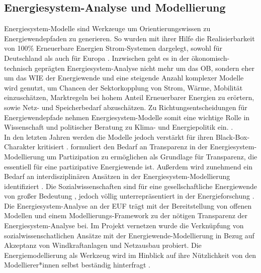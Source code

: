 \documentclass[a4paper,11pt,twoside]{scrartcl}
\begin{document}
\subsection*{Energiesystem-Analyse und Modellierung}
Energiesystem-Modelle sind Werkzeuge um  Orientierungswissen zu Energiewendepfaden zu generieren. So wurden mit ihrer Hilfe die Realisierbarkeit von 100\% Erneuerbare Energien Strom-Systemen dargelegt, sowohl für Deutschland \cite{SRU2011} als auch für Europa \cite{Hohmeyer2015}. Inzwischen geht es in der ökonomisch-technisch geprägten Energiesystem-Analyse nicht mehr um das OB, sondern eher um das WIE der Energiewende und  eine steigende Anzahl komplexer Modelle wird genutzt, um Chancen der Sektorkopplung von Strom, Wärme, Mobilität \cite{Quaschning2016} einzuschätzen, Marktregeln bei hohem Anteil Erneuerbarer Energien zu erörtern, sowie Netz- \cite{openEgo2015} und Speicherbedarf \cite{ANGUS2017} abzuschätzen.
Zu Richtungsentscheidungen für Energiewendepfade nehmen Energiesystem-Modelle somit eine wichtige Rolle in Wissenschaft und politischer Beratung zu Klima- und Energiepolitik ein. \cite{Dieckhoff2015}.\\
In den letzten Jahren werden die Modelle jedoch verstärkt für ihren Black-Box-Charakter kritisiert \cite{Pfenninger2017, Pfenninger2017b,Cao2016}. \citep{Wiese2015} formuliert den Bedarf an Transparenz in der Energiesystem-Modellierung um Partizipation zu ermöglichen \cite{Wiese2014} als Grundlage für Transparenz, die essentiell für eine partizipative Energiewende ist.
Außerdem wird zunehmend ein Bedarf an interdisziplinären Ansätzen in der Energiesystem-Modellierung identifiziert \cite{Wiese2018,Pfenninger2014,Schuitema2017}. Die  Sozialwissenschaften sind für eine gesellschaftliche Energiewende von großer Bedeutung \cite{Sovacool2015}, jedoch völlig unterrepräsentiert in der Energieforschung \cite{Sovacool2014}.\\
Die Energiesystem-Analyse an der EUF trägt mit der Bereitstellung von offenen Modellen \cite{renpass,renpassGIS} und einem Modellierungs-Framework \cite{oemof} zu der nötigen Transparenz der Energiesystem-Analyse bei. Im Projekt vernetzen \cite{vernetzen2016} wurde die Verknüpfung von sozialwissenschatlichen Ansätze mit der Energiewende-Modellierung in Bezug auf Akzeptanz von Windkraftanlagen und Netzausbau probiert. Die Energiemodellierung als Werkzeug wird im Hinblick auf ihre Nützlichkeit von den Modellierer*innen selbst beständig hinterfragt \cite{Wiese2018}.  %
\end{document}
